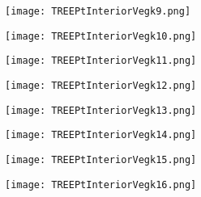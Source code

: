 \documentclass[pdf]{beamer}
\begin{document}
\begin{frame}
\begin{figure}[!h]
\centering
\texttt{[image: TREEPtInteriorVegk9.png]}
\end{figure}
\end{frame}

\begin{frame}
\begin{figure}[!h]
\centering
\texttt{[image: TREEPtInteriorVegk10.png]}
\end{figure}
\end{frame}

\begin{frame}
\begin{figure}[!h]
\centering
\texttt{[image: TREEPtInteriorVegk11.png]}
\end{figure}
\end{frame}

\begin{frame}
\begin{figure}[!h]
\centering
\texttt{[image: TREEPtInteriorVegk12.png]}
\end{figure}
\end{frame}

\begin{frame}
\begin{figure}[!h]
\centering
\texttt{[image: TREEPtInteriorVegk13.png]}
\end{figure}
\end{frame}

\begin{frame}
\begin{figure}[!h]
\centering
\texttt{[image: TREEPtInteriorVegk14.png]}
\end{figure}
\end{frame}

\begin{frame}
\begin{figure}[!h]
\centering
\texttt{[image: TREEPtInteriorVegk15.png]}
\end{figure}
\end{frame}

\begin{frame}
\begin{figure}[!h]
\centering
\texttt{[image: TREEPtInteriorVegk16.png]}
\end{figure}
\end{frame}
\end{document}
